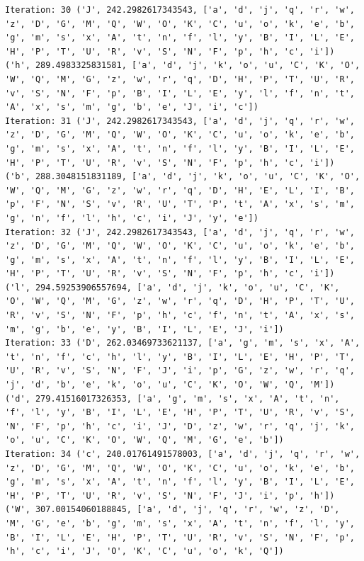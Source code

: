 \documentclass[11pt]{article}
\begin{document}
\begin{lstlisting}
Iteration: 30 ('J', 242.2982617343543, ['a', 'd', 'j', 'q', 'r', 'w', 'z', 'D', 'G', 'M', 'Q', 'W', 'O', 'K', 'C', 'u', 'o', 'k', 'e', 'b', 'g', 'm', 's', 'x', 'A', 't', 'n', 'f', 'l', 'y', 'B', 'I', 'L', 'E', 'H', 'P', 'T', 'U', 'R', 'v', 'S', 'N', 'F', 'p', 'h', 'c', 'i']) ('h', 289.4983325831581, ['a', 'd', 'j', 'k', 'o', 'u', 'C', 'K', 'O', 'W', 'Q', 'M', 'G', 'z', 'w', 'r', 'q', 'D', 'H', 'P', 'T', 'U', 'R', 'v', 'S', 'N', 'F', 'p', 'B', 'I', 'L', 'E', 'y', 'l', 'f', 'n', 't', 'A', 'x', 's', 'm', 'g', 'b', 'e', 'J', 'i', 'c'])
Iteration: 31 ('J', 242.2982617343543, ['a', 'd', 'j', 'q', 'r', 'w', 'z', 'D', 'G', 'M', 'Q', 'W', 'O', 'K', 'C', 'u', 'o', 'k', 'e', 'b', 'g', 'm', 's', 'x', 'A', 't', 'n', 'f', 'l', 'y', 'B', 'I', 'L', 'E', 'H', 'P', 'T', 'U', 'R', 'v', 'S', 'N', 'F', 'p', 'h', 'c', 'i']) ('b', 288.3048151831189, ['a', 'd', 'j', 'k', 'o', 'u', 'C', 'K', 'O', 'W', 'Q', 'M', 'G', 'z', 'w', 'r', 'q', 'D', 'H', 'E', 'L', 'I', 'B', 'p', 'F', 'N', 'S', 'v', 'R', 'U', 'T', 'P', 't', 'A', 'x', 's', 'm', 'g', 'n', 'f', 'l', 'h', 'c', 'i', 'J', 'y', 'e'])
Iteration: 32 ('J', 242.2982617343543, ['a', 'd', 'j', 'q', 'r', 'w', 'z', 'D', 'G', 'M', 'Q', 'W', 'O', 'K', 'C', 'u', 'o', 'k', 'e', 'b', 'g', 'm', 's', 'x', 'A', 't', 'n', 'f', 'l', 'y', 'B', 'I', 'L', 'E', 'H', 'P', 'T', 'U', 'R', 'v', 'S', 'N', 'F', 'p', 'h', 'c', 'i']) ('l', 294.59253906557694, ['a', 'd', 'j', 'k', 'o', 'u', 'C', 'K', 'O', 'W', 'Q', 'M', 'G', 'z', 'w', 'r', 'q', 'D', 'H', 'P', 'T', 'U', 'R', 'v', 'S', 'N', 'F', 'p', 'h', 'c', 'f', 'n', 't', 'A', 'x', 's', 'm', 'g', 'b', 'e', 'y', 'B', 'I', 'L', 'E', 'J', 'i'])
Iteration: 33 ('D', 262.03469733621137, ['a', 'g', 'm', 's', 'x', 'A', 't', 'n', 'f', 'c', 'h', 'l', 'y', 'B', 'I', 'L', 'E', 'H', 'P', 'T', 'U', 'R', 'v', 'S', 'N', 'F', 'J', 'i', 'p', 'G', 'z', 'w', 'r', 'q', 'j', 'd', 'b', 'e', 'k', 'o', 'u', 'C', 'K', 'O', 'W', 'Q', 'M']) ('d', 279.41516017326353, ['a', 'g', 'm', 's', 'x', 'A', 't', 'n', 'f', 'l', 'y', 'B', 'I', 'L', 'E', 'H', 'P', 'T', 'U', 'R', 'v', 'S', 'N', 'F', 'p', 'h', 'c', 'i', 'J', 'D', 'z', 'w', 'r', 'q', 'j', 'k', 'o', 'u', 'C', 'K', 'O', 'W', 'Q', 'M', 'G', 'e', 'b'])
Iteration: 34 ('c', 240.01761491578003, ['a', 'd', 'j', 'q', 'r', 'w', 'z', 'D', 'G', 'M', 'Q', 'W', 'O', 'K', 'C', 'u', 'o', 'k', 'e', 'b', 'g', 'm', 's', 'x', 'A', 't', 'n', 'f', 'l', 'y', 'B', 'I', 'L', 'E', 'H', 'P', 'T', 'U', 'R', 'v', 'S', 'N', 'F', 'J', 'i', 'p', 'h']) ('W', 307.00154060188845, ['a', 'd', 'j', 'q', 'r', 'w', 'z', 'D', 'M', 'G', 'e', 'b', 'g', 'm', 's', 'x', 'A', 't', 'n', 'f', 'l', 'y', 'B', 'I', 'L', 'E', 'H', 'P', 'T', 'U', 'R', 'v', 'S', 'N', 'F', 'p', 'h', 'c', 'i', 'J', 'O', 'K', 'C', 'u', 'o', 'k', 'Q'])

\end{lstlisting}
\end{document}
